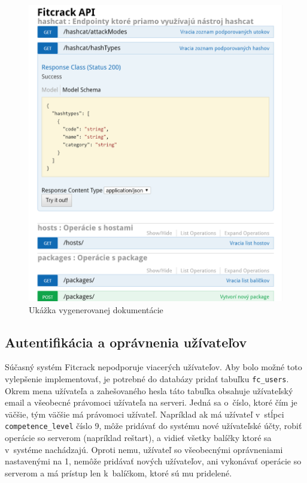 \documentclass[slovak,cprint]{fitthesis} %
\begin{document}
\begin{figure}[H]
    \centering
    \label{fig:doc}
    \includegraphics[scale=0.45]{obrazky/doc.PNG}
    \caption{Ukážka vygenerovanej dokumentácie}
\end{figure}

\subsection{Autentifikácia a oprávnenia užívateľov}
Súčasný systém Fitcrack nepodporuje viacerých užívateľov. Aby bolo možné toto vylepšenie implementovať, je potrebné do databázy pridať tabuľku \texttt{fc\_users}. Okrem mena užívateľa a zahešovaného hesla táto tabuľka obsahuje užívateľský email a všeobecné právomoci užívateľa na serveri. Jedná sa o~číslo, ktoré čím je väčšie, tým väčšie má právomoci užívateľ. Napríklad ak má užívateľ v~stĺpci \texttt{competence\_level} číslo 9, môže pridávať do systému nové užívateľské účty, robiť operácie so serverom (napríklad reštart), a vidieť všetky balíčky ktoré sa v~systéme nachádzajú. Oproti nemu, užívateľ so všeobecnými oprávneniami nastavenými na 1, nemôže pridávať nových užívateľov, ani vykonávať operácie so serverom a má prístup len k~balíčkom, ktoré sú mu pridelené.
\end{document}
